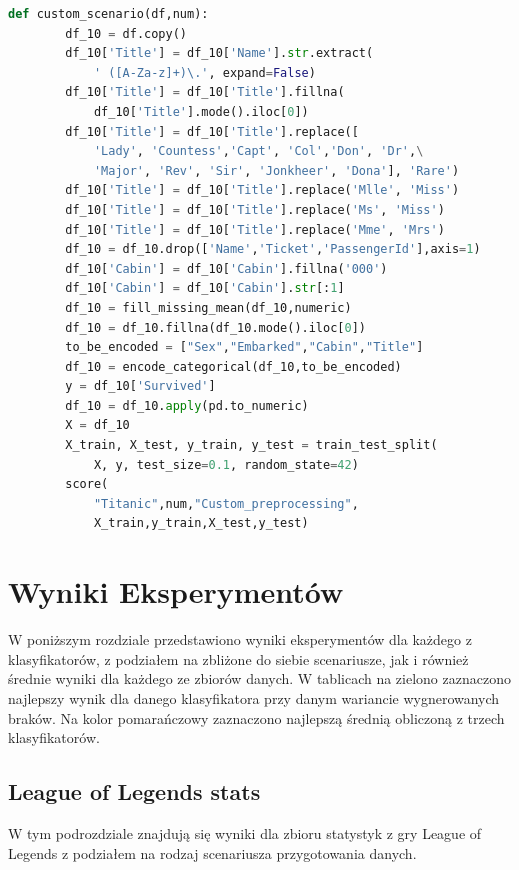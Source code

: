 \documentclass[oneside]{book}
\begin{document}
\begin{itemize}
\begin{lstlisting}[language=Python, caption={Usuwanie 
    wartości odstających}, captionpos=b]
    def custom_scenario(df,num):
        df_10 = df.copy()
        df_10['Title'] = df_10['Name'].str.extract(
            ' ([A-Za-z]+)\.', expand=False)
        df_10['Title'] = df_10['Title'].fillna(
            df_10['Title'].mode().iloc[0])
        df_10['Title'] = df_10['Title'].replace([
            'Lady', 'Countess','Capt', 'Col','Don', 'Dr',\
            'Major', 'Rev', 'Sir', 'Jonkheer', 'Dona'], 'Rare')
        df_10['Title'] = df_10['Title'].replace('Mlle', 'Miss')
        df_10['Title'] = df_10['Title'].replace('Ms', 'Miss')
        df_10['Title'] = df_10['Title'].replace('Mme', 'Mrs')
        df_10 = df_10.drop(['Name','Ticket','PassengerId'],axis=1)
        df_10['Cabin'] = df_10['Cabin'].fillna('000')
        df_10['Cabin'] = df_10['Cabin'].str[:1]
        df_10 = fill_missing_mean(df_10,numeric)
        df_10 = df_10.fillna(df_10.mode().iloc[0])
        to_be_encoded = ["Sex","Embarked","Cabin","Title"]
        df_10 = encode_categorical(df_10,to_be_encoded)
        y = df_10['Survived']
        df_10 = df_10.apply(pd.to_numeric)
        X = df_10
        X_train, X_test, y_train, y_test = train_test_split(
            X, y, test_size=0.1, random_state=42)
        score(
            "Titanic",num,"Custom_preprocessing",
            X_train,y_train,X_test,y_test)
\end{lstlisting}

\end{itemize}

\chapter{Wyniki Eksperymentów}

W poniższym rozdziale przedstawiono wyniki eksperymentów dla każdego z klasyfikatorów, 
z podziałem na zbliżone do siebie scenariusze, jak i również średnie wyniki dla każdego 
ze zbiorów danych. W tablicach na zielono zaznaczono najlepszy wynik dla danego klasyfikatora 
przy danym wariancie wygnerowanych braków. Na kolor pomarańczowy zaznaczono najlepszą średnią obliczoną
z trzech klasyfikatorów.

\section{League of Legends stats}

W tym podrozdziale znajdują się wyniki dla zbioru statystyk z 
gry League of Legends z podziałem na rodzaj scenariusza przygotowania danych.
\end{document}
